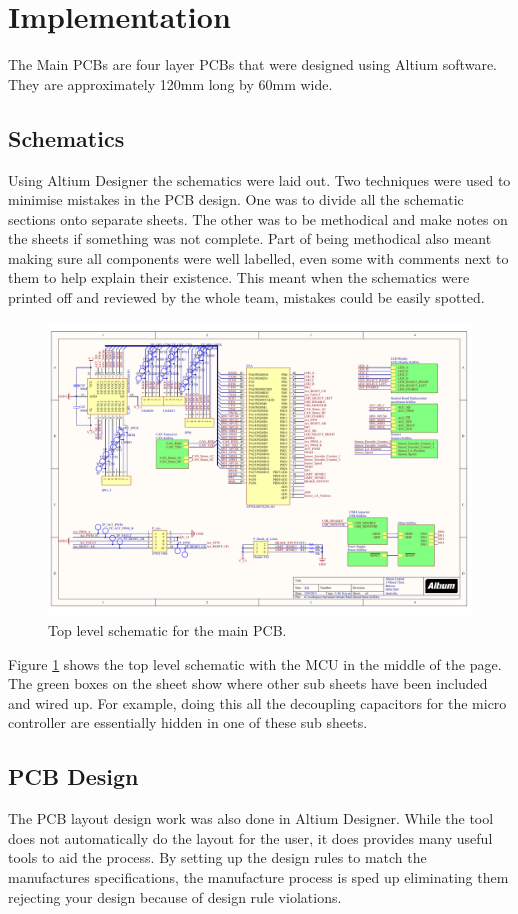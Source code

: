 \section{Implementation}
  The Main PCBs are four layer PCBs that were designed using Altium software.
  They are approximately 120mm long by 60mm wide.

  \subsection{Schematics}
  Using Altium Designer the schematics were laid out. Two techniques were used
  to minimise mistakes in the PCB design. One was to divide all the schematic
  sections onto separate sheets. The other was to be methodical and make notes
  on the sheets if something was not complete. Part of being methodical also
  meant making sure all components were well labelled, even some with comments
  next to them to help explain their existence. This meant when the schematics
  were printed off and reviewed by the whole team, mistakes could be easily
  spotted.
  
  \begin{figure}[h]
      \centering
      \includegraphics[width=.8\linewidth]{../../Presentation/Henry/Images/Schematic.pdf}
      \caption{Top level schematic for the main PCB.}
      \label{main-schematic}
  \end{figure}

  Figure \ref{main-schematic} shows the top level schematic with the MCU in the
  middle of the page. The green boxes on the sheet show where other sub sheets
  have been included and wired up. For example, doing this all the decoupling
  capacitors for the micro controller are essentially hidden in one of these
  sub sheets. 

  \subsection{PCB Design}
  The PCB layout design work was also done in Altium Designer. While the tool
  does not automatically do the layout for the user, it does provides many
  useful tools to aid the process. By setting up the design rules to match the
  manufactures specifications, the manufacture process is sped up eliminating
  them rejecting your design because of design rule violations.

